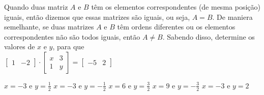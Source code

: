 Quando duas matriz $A$ e $B$ têm os elementos correspondentes (de mesma posição) iguais, então dizemos que essas matrizes são iguais, ou seja, $A=B$. De maniera semelhante, se duas matrizes $A$ e $B$ têm ordens diferentes ou os elementos correspondentes não são todos iguais, então $A\neq B$. Sabendo disso, determine os valores de $x$ e $y$, para que\\$\left[ \begin{array}{cc}
1 & -2
\end{array} \right] \cdot \left[ \begin{array}{cc}
x & 3 \\
1 & y
\end{array} \right] = \left[ \begin{array}{cc}
-5 & 2
\end{array} \right]$

$x=-3$ e $y=\frac{1}{2}$
$x=-3$ e $y=-\frac{1}{2}$
$x=6$ e $y=\frac{3}{2}$
$x=9$ e $y=-\frac{3}{2}$
$x=-3$ e $y=2$



